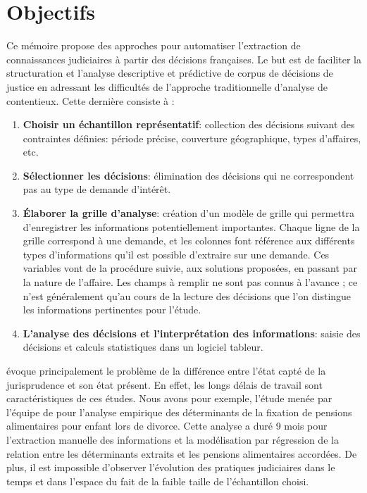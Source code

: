 \section{Objectifs}
 Ce mémoire propose des approches pour automatiser l'extraction de connaissances judiciaires à partir des décisions françaises. Le but est de faciliter la structuration et l'analyse descriptive et prédictive de corpus de décisions de justice en adressant les difficultés de l'approche traditionnelle d'analyse de contentieux. Cette dernière consiste à \citep{ancel2003expulsion} :
 \begin{enumerate}
 	\item \textbf{Choisir un échantillon représentatif}: collection des décisions suivant des contraintes définies:  période précise, couverture géographique, types d'affaires, etc.
 	\item \textbf{Sélectionner les décisions}: élimination des décisions qui ne correspondent pas au type de demande d'intérêt.
 	\item \textbf{Élaborer la grille d'analyse}: création d'un modèle de grille qui permettra d'enregistrer les informations potentiellement importantes. Chaque ligne de la grille correspond à une demande, et les colonnes font référence aux différents types d'informations qu'il est possible d'extraire sur une demande. Ces variables vont de la procédure suivie, aux solutions proposées, en passant par la nature de l'affaire. Les champs à remplir ne sont pas connus à l'avance ; ce n'est généralement qu'au cours de la lecture des décisions que l'on distingue les informations pertinentes pour l'étude.
 	\item \textbf{L'analyse des décisions et l'interprétation des informations}: saisie des décisions et calculs statistiques dans un logiciel tableur.
 \end{enumerate}
 
\citet{ancel2003expulsion} évoque principalement le problème de la différence entre l'état capté de la jurisprudence et son état présent. En effet, les longs délais de travail sont caractéristiques de ces études. Nous avons pour exemple, l'étude menée  par l'équipe de \citet{jeandidier2006pensions} pour l'analyse empirique des déterminants de la fixation de pensions alimentaires pour enfant lors de divorce. Cette analyse a duré 9 mois pour l'extraction manuelle des informations et la modélisation par régression de la relation entre les déterminants extraits et les pensions alimentaires accordées.  De plus, il est impossible d'observer l'évolution des pratiques judiciaires dans le temps et dans l'espace du fait de la faible taille de l'échantillon choisi. %
 

